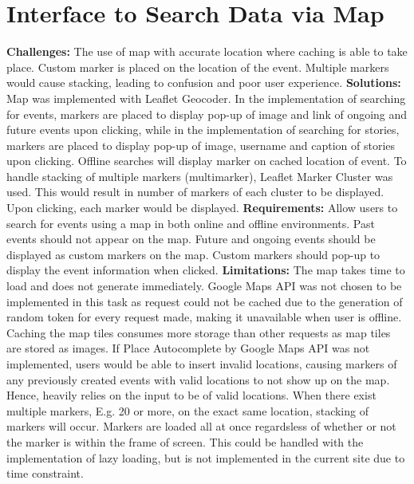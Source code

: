 \documentclass[11pt, a4paper]{article}
\begin{document}
\section{Interface to Search Data via Map}
\textbf{Challenges:} The use of map with accurate location where caching is able to take place.
Custom marker is placed on the location of the event. Multiple markers would cause stacking, leading
to confusion and poor user experience. \textbf{Solutions:} Map was implemented with Leaflet Geocoder.
In the implementation of searching for events, markers are placed to display pop-up of image and
link of ongoing and future events upon clicking, while in the implementation of searching for
stories, markers are placed to display pop-up of image, username and caption of stories upon clicking.
Offline searches will display marker on cached location of event. To handle stacking of multiple
markers (multimarker), Leaflet Marker Cluster was used. This would result in number of markers
of each cluster to be displayed. Upon clicking, each marker would be displayed. \textbf{Requirements:}
Allow users to search for events using a map in both online and offline environments. Past events 
should not appear on the map. Future and ongoing events should be displayed as custom markers on the
map. Custom markers should pop-up to display the event information when clicked. \textbf{Limitations:}
The map takes time to load and does not generate immediately. Google Maps API was not chosen to be
implemented in this task as request could not be cached due to the generation of random token for
every request made, making it unavailable when user is offline. Caching the map tiles consumes more
storage than other requests as map tiles are stored as images. If Place Autocomplete by Google Maps
API \cite{google_maps_api} was not implemented, users would be able to insert invalid locations,
causing markers of any previously created events with valid locations to not show up on the map.
Hence, heavily relies on the input to be of valid locations. When there exist multiple markers, E.g.
20 or more, on the exact same location, stacking of markers will occur. Markers are loaded all at
once regardsless of whether or not the marker is within the frame of screen. This could be handled
with the implementation of lazy loading, but is not implemented in the current site due to time
constraint.
\end{document}
